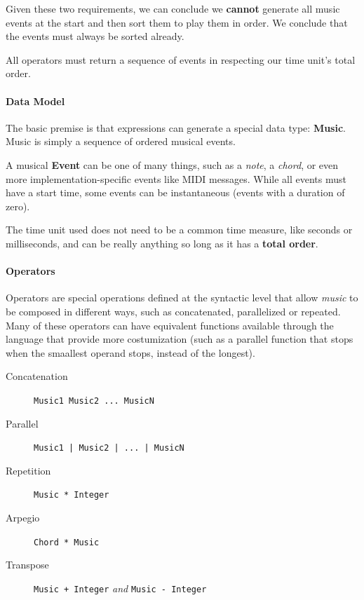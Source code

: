 \documentclass[a4paper,UKenglish,cleveref, autoref]{oasics-v2019}
\begin{document}
Given these two requirements, we can conclude we \textbf{cannot} generate all music events at the start and then sort them to play them in order. We conclude that the events must always be sorted already.

\begin{lemma}
\label{lemma:total-order} All operators must return a sequence of events in respecting our time unit's total order.
\end{lemma}

\paragraph*{Data Model}
The basic premise is that expressions can generate a special data type: \textbf{Music}. Music is simply a sequence of ordered musical events.

A musical \textbf{Event} can be one of many things, such as a \textit{note}, a \textit{chord}, or even more implementation-specific events like MIDI messages. While all events must have a start time, some events can be instantaneous (events with a duration of zero).



The time unit used does not need to be a common time measure, like seconds or milliseconds, and can be really anything so long as it has a \textbf{total order}.

\paragraph*{Operators}
Operators are special operations defined at the syntactic level that allow \textit{music} to be composed in different ways, such as concatenated, parallelized or repeated. Many of these operators can have equivalent functions available through the language that provide more costumization (such as a parallel function that stops when the smaallest operand stops, instead of the longest).

\begin{description}
    \item[Concatenation] \verb|Music1 Music2 ... MusicN|
    \item[Parallel] \verb'Music1 | Music2 | ... | MusicN'
    \item[Repetition] \verb'Music * Integer'
    \item[Arpegio] \verb'Chord * Music'
    \item[Transpose] \verb'Music + Integer' \textit{and} \verb'Music - Integer'
\end{description}
\end{document}
